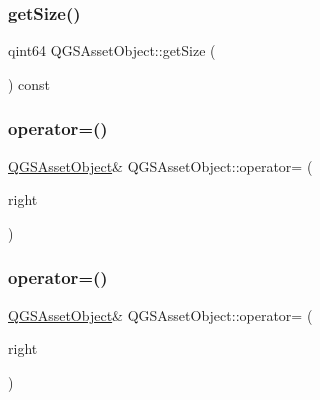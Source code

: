 \mbox{\label{class_q_g_s_asset_object_a18d040d819815f12affc4eefd43f29f1}} 
\subsubsection{\texorpdfstring{get\+Size()}{getSize()}}
{\footnotesize\ttfamily qint64 Q\+G\+S\+Asset\+Object\+::get\+Size (\begin{DoxyParamCaption}{ }\end{DoxyParamCaption}) const}

\mbox{\label{class_q_g_s_asset_object_a0e7fe5c699edeaf51ef79709dbfde122}} 
\subsubsection{\texorpdfstring{operator=()}{operator=()}\hspace{0.1cm}{\footnotesize\ttfamily [1/2]}}
{\footnotesize\ttfamily \mbox{\hyperlink{class_q_g_s_asset_object}{Q\+G\+S\+Asset\+Object}}\& Q\+G\+S\+Asset\+Object\+::operator= (\begin{DoxyParamCaption}\item[{const \mbox{\hyperlink{class_q_g_s_asset_object}{Q\+G\+S\+Asset\+Object}} \&}]{right }\end{DoxyParamCaption})\hspace{0.3cm}{\ttfamily [default]}}

\mbox{\label{class_q_g_s_asset_object_a405e1c3ce2f3b4fe043a3f8c87d3ba7b}} 
\subsubsection{\texorpdfstring{operator=()}{operator=()}\hspace{0.1cm}{\footnotesize\ttfamily [2/2]}}
{\footnotesize\ttfamily \mbox{\hyperlink{class_q_g_s_asset_object}{Q\+G\+S\+Asset\+Object}}\& Q\+G\+S\+Asset\+Object\+::operator= (\begin{DoxyParamCaption}\item[{\mbox{\hyperlink{class_q_g_s_asset_object}{Q\+G\+S\+Asset\+Object}} \&\&}]{right }\end{DoxyParamCaption})\hspace{0.3cm}{\ttfamily [default]}}

